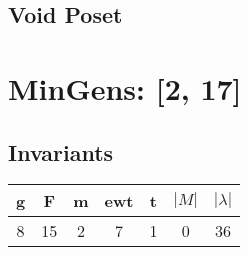 \documentclass[a4paper]{article}
\begin{document}
\hfill\begin{minipage}{0.48\textwidth}
\subsection*{Void Poset}
\centering
{}
\end{minipage}
\newpage\section{MinGens: [2, 17]}
\noindent\begin{minipage}{0.6\textwidth}
\subsection*{Invariants}
\centering
\begin{tabular}{|c|c|c|c|c|c|c|}
\toprule
g & F & m & ewt & t & \(|M|\) & \(|\lambda|\) \\
\midrule
8 & 15 & 2 & 7 & 1 & 0 & 36 \\
\bottomrule
\end{tabular}
\end{minipage}%
\end{document}
